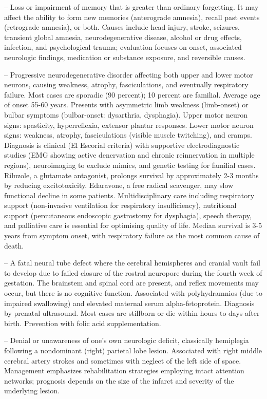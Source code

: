 -- Loss or impairment of memory that is greater than ordinary forgetting. It may affect the ability to form new memories (anterograde amnesia), recall past events (retrograde amnesia), or both. Causes include head injury, stroke, seizures, transient global amnesia, neurodegenerative disease, alcohol or drug effects, infection, and psychological trauma; evaluation focuses on onset, associated neurologic findings, medication or substance exposure, and reversible causes.

-- Progressive neurodegenerative disorder affecting both upper and lower motor neurons, causing weakness, atrophy, fasciculations, and eventually respiratory failure. Most cases are sporadic (90 percent); 10 percent are familial. Average age of onset 55-60 years. Presents with asymmetric limb weakness (limb-onset) or bulbar symptoms (bulbar-onset: dysarthria, dysphagia). Upper motor neuron signs: spasticity, hyperreflexia, extensor plantar responses. Lower motor neuron signs: weakness, atrophy, fasciculations (visible muscle twitching), and cramps. Diagnosis is clinical (El Escorial criteria) with supportive electrodiagnostic studies (EMG showing active denervation and chronic reinnervation in multiple regions), neuroimaging to exclude mimics, and genetic testing for familial cases. Riluzole, a glutamate antagonist, prolongs survival by approximately 2-3 months by reducing excitotoxicity. Edaravone, a free radical scavenger, may slow functional decline in some patients. Multidisciplinary care including respiratory support (non-invasive ventilation for respiratory insufficiency), nutritional support (percutaneous endoscopic gastrostomy for dysphagia), speech therapy, and palliative care is essential for optimising quality of life. Median survival is 3-5 years from symptom onset, with respiratory failure as the most common cause of death.

-- A fatal neural tube defect where the cerebral hemispheres and cranial vault fail to develop due to failed closure of the rostral neuropore during the fourth week of gestation. The brainstem and spinal cord are present, and reflex movements may occur, but there is no cognitive function. Associated with polyhydramnios (due to impaired swallowing) and elevated maternal serum alpha-fetoprotein. Diagnosis by prenatal ultrasound. Most cases are stillborn or die within hours to days after birth. Prevention with folic acid supplementation.

-- Denial or unawareness of one's own neurologic deficit, classically hemiplegia following a nondominant (right) parietal lobe lesion. Associated with right middle cerebral artery strokes and sometimes with neglect of the left side of space. Management emphasizes rehabilitation strategies employing intact attention networks; prognosis depends on the size of the infarct and severity of the underlying lesion.

